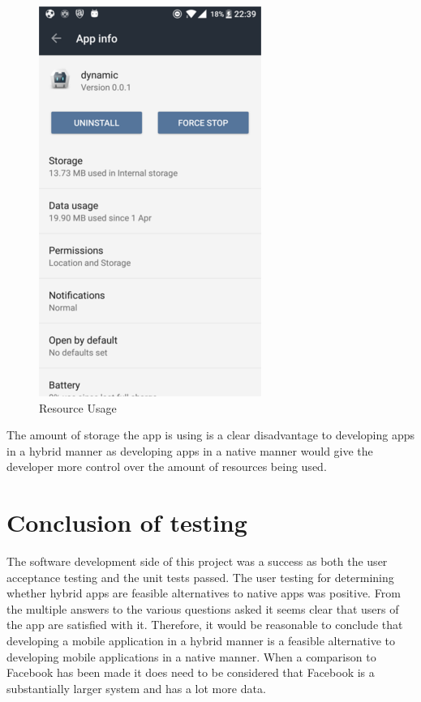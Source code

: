 \begin{center}
\begin{figure}[H]
\includegraphics[scale=0.5]{images/usage}
\caption{Resource Usage}
\end{figure}
\end{center}

The amount of storage the app is using is a clear disadvantage to developing apps in a hybrid manner as developing apps in a native manner would give the developer more control over the amount of resources being used.

\section{Conclusion of testing}
The software development side of this project was a success as both the user acceptance testing and the unit tests passed. The user testing for determining whether hybrid apps are feasible alternatives to native apps was positive. From the multiple answers to the various questions asked it seems clear that users of the app are satisfied with it. Therefore, it would be reasonable to conclude that developing a mobile application in a hybrid manner is a feasible alternative to developing mobile applications in a native manner. When a comparison to Facebook has been made it does need to be considered that Facebook is a substantially larger system and has a lot more data. 

